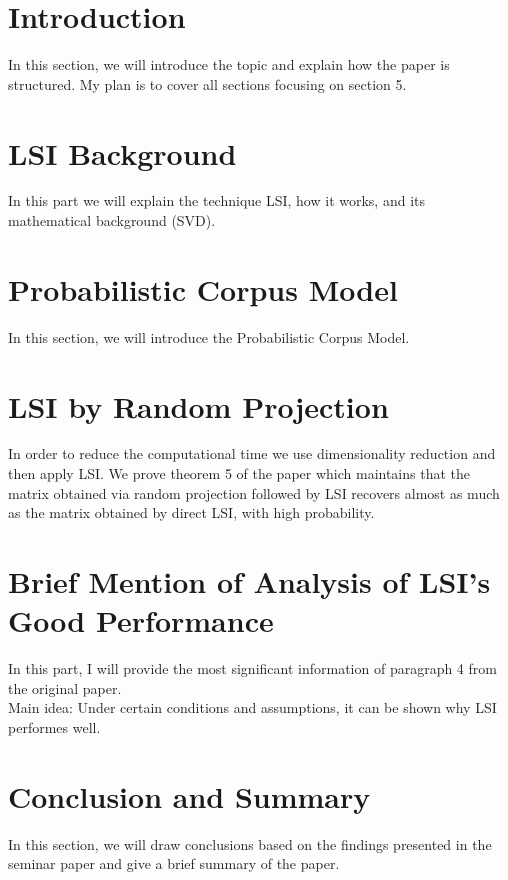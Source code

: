 \documentclass[a4paper,11pt,DIV=15]{scrartcl} %
\theoremstyle{plain}
\theoremstyle{definition}
\begin{document}
\clearpage


\section{Introduction} %
In this section, we will introduce the topic and explain how the paper is structured.
My plan is to cover all sections focusing on section 5.
 

\section{LSI Background} %
In this part we will explain the technique LSI, how it works, and its mathematical background (SVD).

\section{Probabilistic Corpus Model} %
In this section, we will introduce the Probabilistic Corpus Model.

\section{LSI by Random Projection} %
In order to reduce the computational time we use dimensionality reduction and then apply LSI. We prove theorem 5 of the paper which maintains that the matrix obtained via random projection followed by LSI recovers almost as
much as the matrix obtained by direct LSI, with high probability.

\section{Brief Mention of Analysis of LSI's Good Performance} %
In this part, I will provide the most significant information of paragraph 4 from the original paper. \\
Main idea: Under certain conditions and assumptions, it can be shown why LSI performes well.

\section{Conclusion and Summary} %
In this section, we will draw conclusions based on the findings presented in the seminar paper and give a brief summary of the paper.












\clearpage



\end{document}
